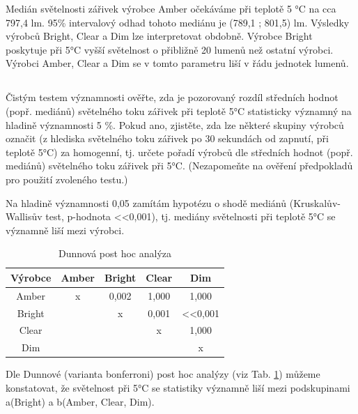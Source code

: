 \documentclass[czech]{article}%
\begin{document}
Medián světelnosti zářivek výrobce Amber očekáváme při teplotě 5 °C na cca 797,4 lm. 
95\% intervalový odhad tohoto mediánu je (789,1 ; 801,5) lm. Výsledky výrobců Bright, Clear a Dim
lze interpretovat obdobně. Výrobce Bright poskytuje při 5°C vyšší světelnost o přibližně 20 lumenů než ostatní výrobci.
Výrobci Amber, Clear a Dim se v tomto parametru liší v řádu jednotek lumenů.

\newpage
\subsection{}
Čistým testem významnosti ověřte, zda je pozorovaný rozdíl středních hodnot 
(popř. mediánů) světelného toku zářivek při teplotě 5°C statisticky významný 
na hladině významnosti 5 \%. Pokud ano, zjistěte, zda lze některé skupiny výrobců 
označit (z hlediska světelného toku zářivek po 30 sekundách od zapnutí, při teplotě 5°C) 
za homogenní, tj. určete pořadí výrobců dle středních hodnot (popř. mediánů) 
světelného toku zářivek při 5°C. (Nezapomeňte na ověření předpokladů pro použití zvoleného testu.)

Na hladině významnosti 0,05 zamítám hypotézu o shodě mediánů (Kruskalův-Wallisův test, p-hodnota \textless{}\textless{}0,001), 
tj. mediány světelnosti při teplotě 5°C se významně liší mezi výrobci.

\begin{table}[H]
	\centering
	\caption{Dunnová post hoc analýza}
	\label{tab:dunn_3}
    \begin{tabular}{c|c|c|c|c}
        Výrobce & Amber & Bright    & Clear & Dim                           \\
        \hline
        Amber   & x     & 0,002     & 1,000 & 1,000                         \\
        \hline
        Bright  &       & x         & 0,001 & \textless{}\textless{}0,001   \\
        \hline
        Clear   &       &           & x     & 1,000                         \\
        \hline
        Dim     &       &           &       & x                             \\
    \end{tabular}
\end{table}

Dle Dunnové (varianta bonferroni) post hoc analýzy (viz Tab. \ref{tab:dunn_3}) můžeme konstatovat, 
že světelnost při 5°C se statistiky významně liší mezi podskupinami a(Bright) a b(Amber, Clear, Dim). 
\end{document}

